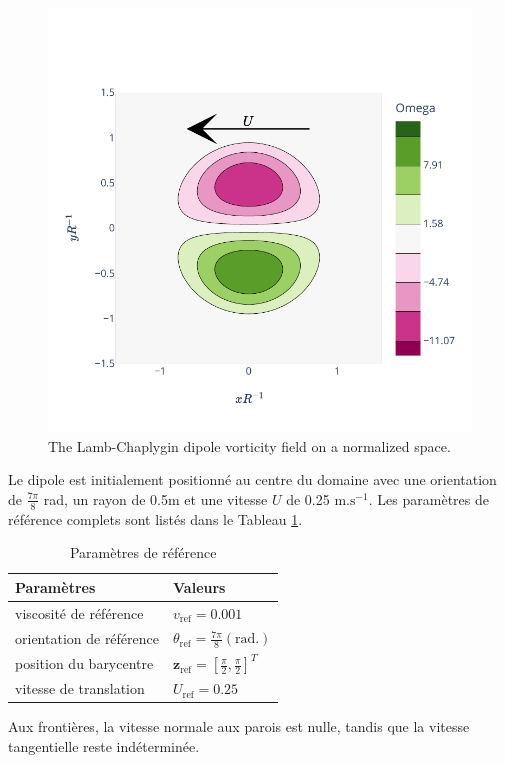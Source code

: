 \begin{figure}[ht]
    \centering
    \includegraphics[width=0.6\linewidth]{images/app2d/lamb.pdf}
    \caption{The Lamb-Chaplygin dipole vorticity field on a normalized space.}
    \label{fig:lamb_dipole}
\end{figure}

Le dipole est initialement positionné au centre du domaine avec une orientation de \(\frac{7\pi}{8}\) rad, un rayon de 0.5m et une vitesse \(U\) de 0.25 \(\text{m.s}^{-1}\). Les paramètres de référence complets sont listés dans le Tableau \ref{tab:ref}.

\begin{table}[htbp]
    \centering
    \caption{Paramètres de référence}
    \begin{tabular}[t]{|l|l|}
        \hline
        Paramètres               & Valeurs                                                              \\
        \hline
        viscosité de référence   & $v_{\text{ref}} = 0.001$                                             \\
        orientation de référence & $\theta_{\text{ref}}  = \frac{7 \pi}{8} (\text{rad.})$               \\
        position du barycentre   & $\bm{z}_{\text{ref}} = \left[\frac{\pi}{2}, \frac{\pi}{2} \right]^T$ \\
        vitesse de translation   & $U_{\text{ref}} = 0.25$                                              \\
        \hline
    \end{tabular}
    \label{tab:ref}
\end{table}

Aux frontières, la vitesse normale aux parois est nulle, tandis que la vitesse tangentielle reste indéterminée.

